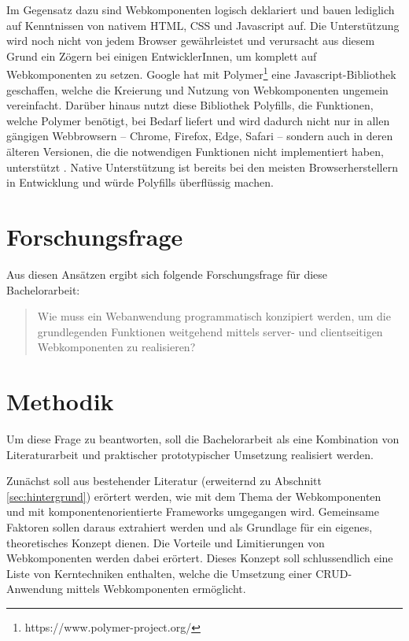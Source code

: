 Im Gegensatz dazu sind Webkomponenten logisch deklariert und bauen lediglich auf Kenntnissen von nativem HTML, CSS und Javascript auf. Die Unterstützung wird noch nicht von jedem Browser gewährleistet und verursacht aus diesem Grund ein Zögern bei einigen EntwicklerInnen, um komplett auf Webkomponenten zu setzen.
Google hat mit Polymer\footnote{https://www.polymer-project.org/} eine Javascript-Bibliothek geschaffen, welche die Kreierung und Nutzung von Webkomponenten ungemein vereinfacht. Darüber hinaus nutzt diese Bibliothek Polyfills, die Funktionen, welche Polymer benötigt, bei Bedarf liefert und wird dadurch nicht nur in allen gängigen Webbrowsern -- Chrome, Firefox, Edge, Safari --  sondern auch in deren älteren Versionen, die die notwendigen Funktionen nicht implementiert haben, unterstützt \cite{polymer-compatibility}. Native Unterstützung ist bereits bei den meisten Browserherstellern in Entwicklung und würde Polyfills überflüssig machen.  
  
\section{Forschungsfrage}

Aus diesen Ansätzen ergibt sich folgende Forschungsfrage für diese Bachelorarbeit:

\begin{quote}
Wie muss ein Webanwendung programmatisch konzipiert werden, um die grundlegenden Funktionen weitgehend mittels server- und clientseitigen Webkomponenten zu realisieren?
\end{quote}

\section{Methodik}

Um diese Frage zu beantworten, soll die Bachelorarbeit als eine Kombination von Literaturarbeit und praktischer \bzw prototypischer Umsetzung realisiert werden.

Zunächst soll aus bestehender Literatur (erweiternd zu Abschnitt \ref{sec:hintergrund}) erörtert werden, wie mit dem Thema der Webkomponenten und mit komponentenorientierte Frameworks umgegangen wird. Gemeinsame Faktoren sollen daraus extrahiert werden und als Grundlage für ein eigenes, theoretisches Konzept dienen. Die Vorteile und Limitierungen von Webkomponenten werden dabei erörtert. Dieses Konzept soll schlussendlich eine Liste von Kerntechniken enthalten, welche die Umsetzung einer CRUD-Anwendung mittels Webkomponenten ermöglicht.

